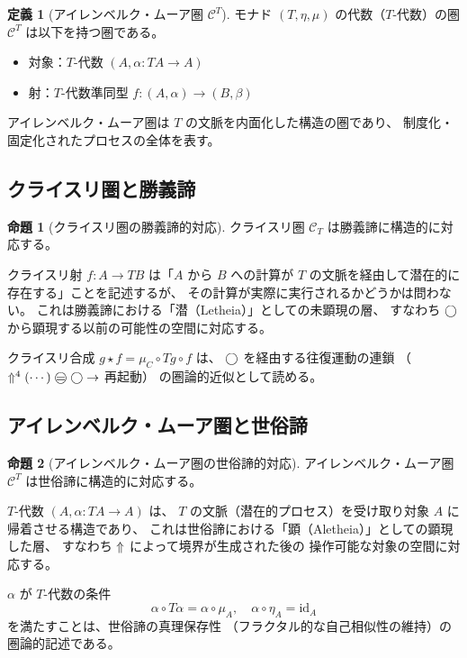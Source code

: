 \documentclass[11pt,a4paper]{ltjsarticle}
\theoremstyle{definition}
\newtheorem{definition}{定義}[section]
\newtheorem{proposition}{命題}[section]
\begin{document}
\begin{definition}[アイレンベルク・ムーア圏 $\mathcal{C}^T$]
モナド $(T, \eta, \mu)$ の代数（$T$-代数）の圏
$\mathcal{C}^T$ は以下を持つ圏である。
\begin{itemize}
  \item 対象：$T$-代数 $(A, \alpha: TA \to A)$
  \item 射：$T$-代数準同型 $f: (A, \alpha) \to (B, \beta)$
\end{itemize}
アイレンベルク・ムーア圏は $T$ の文脈を内面化した構造の圏であり、
制度化・固定化されたプロセスの全体を表す。
\end{definition}

\subsection{クライスリ圏と勝義諦}

\begin{proposition}[クライスリ圏の勝義諦的対応]
クライスリ圏 $\mathcal{C}_T$ は勝義諦に構造的に対応する。

クライスリ射 $f: A \to TB$ は「$A$ から $B$ への計算が
$T$ の文脈を経由して潜在的に存在する」ことを記述するが、
その計算が実際に実行されるかどうかは問わない。
これは勝義諦における「潜（Letheia）」としての未顕現の層、
すなわち $\bigcirc$ から顕現する以前の可能性の空間に対応する。

クライスリ合成 $g \star f = \mu_C \circ Tg \circ f$ は、
$\bigcirc$ を経由する往復運動の連鎖
（$\metanegation^4(\cdots) \mweq \dfix \to$ 再起動）
の圏論的近似として読める。
\end{proposition}

\subsection{アイレンベルク・ムーア圏と世俗諦}

\begin{proposition}[アイレンベルク・ムーア圏の世俗諦的対応]
アイレンベルク・ムーア圏 $\mathcal{C}^T$ は世俗諦に構造的に対応する。

$T$-代数 $(A, \alpha: TA \to A)$ は、
$T$ の文脈（潜在的プロセス）を受け取り対象 $A$ に帰着させる構造であり、
これは世俗諦における「顕（Aletheia）」としての顕現した層、
すなわち $\Uparrow$ によって境界が生成された後の
操作可能な対象の空間に対応する。

$\alpha$ が $T$-代数の条件
\[
\alpha \circ T\alpha = \alpha \circ \mu_A, \quad \alpha \circ \eta_A = \mathrm{id}_A
\]
を満たすことは、世俗諦の真理保存性
（フラクタル的な自己相似性の維持）の圏論的記述である。
\end{proposition}
\end{document}
